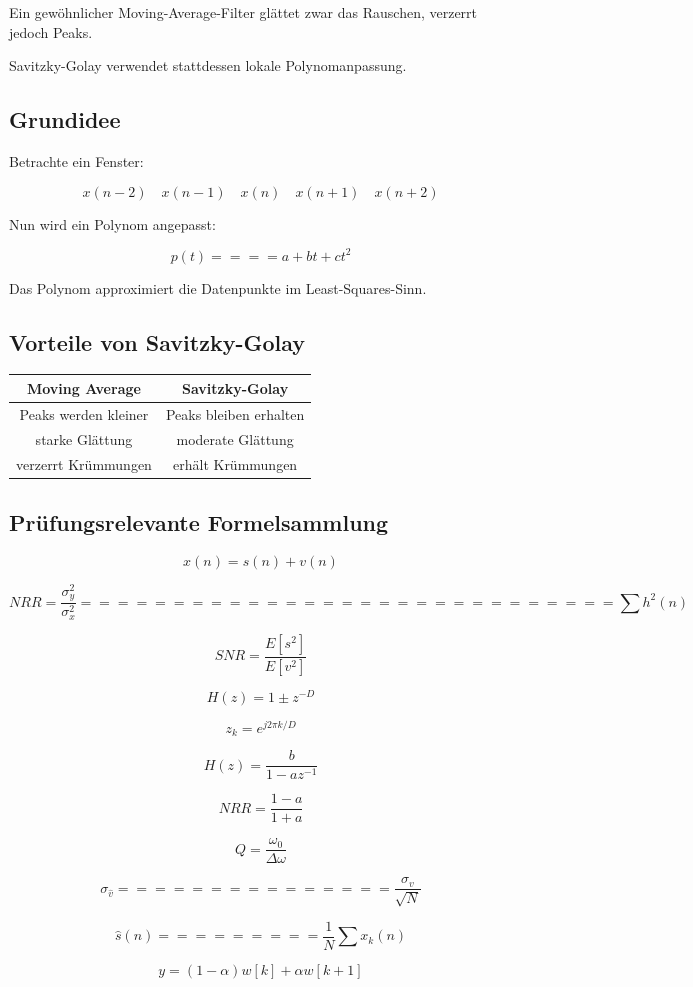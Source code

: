 Ein gewöhnlicher Moving-Average-Filter glättet zwar das Rauschen,
verzerrt jedoch Peaks.

Savitzky-Golay verwendet stattdessen lokale Polynomanpassung.

\subsection{Grundidee}

Betrachte ein Fenster:

\[
x(n-2)
\quad
x(n-1)
\quad
x(n)
\quad
x(n+1)
\quad
x(n+2)
\]

Nun wird ein Polynom angepasst:

\[
p(t)
====

a+bt+ct^2
\]

Das Polynom approximiert die Datenpunkte im Least-Squares-Sinn.

\subsection{Vorteile von Savitzky-Golay}

\begin{table}[h]
\centering
\begin{tabular}{c|c}
Moving Average & Savitzky-Golay \\
\hline
Peaks werden kleiner & Peaks bleiben erhalten \\
starke Glättung & moderate Glättung \\
verzerrt Krümmungen & erhält Krümmungen \\
\end{tabular}
\end{table}

\subsection{Prüfungsrelevante Formelsammlung}

\[
x(n)=s(n)+v(n)
\]

\[
NRR=
\frac{\sigma_y^2}{\sigma_x^2}
=============================

\sum h^2(n)
\]

\[
SNR=
\frac{E[s^2]}{E[v^2]}
\]

\[
H(z)=1\pm z^{-D}
\]

\[
z_k=e^{j2\pi k/D}
\]

\[
H(z)=
\frac{b}
{1-az^{-1}}
\]

\[
NRR=
\frac{1-a}{1+a}
\]

\[
Q=
\frac{\omega_0}{\Delta\omega}
\]

\[
\sigma_{\hat v}
===============

\frac{\sigma_v}{\sqrt N}
\]

\[
\hat s(n)
=========

\frac1N
\sum x_k(n)
\]

\[
y=(1-\alpha)w[k]+\alpha w[k+1]
\]
